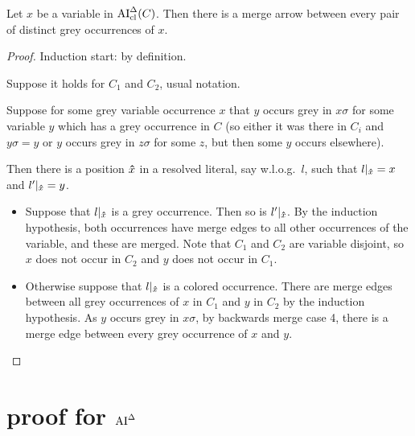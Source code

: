 \documentclass[,%
	paper=a4,%
	DIV10, %
	twoside=false,%
	liststotoc,
	bibtotoc,
	draft=false,%
	numbers=noendperiod
]{scrartcl}
\begin{document}
\begin{lemma}
	\label{lemma:arrow_from_grey_to_grey}
	Let $x$ be a variable in $\operatorname{AI}_\mathrm{cl}^\Delta(C)$.
	Then there is a merge arrow between every pair of distinct grey occurrences of $x$. 
\end{lemma}
\begin{proof}
	Induction start: by definition.

	Suppose it holds for $C_1$ and $C_2$, usual notation.

	Suppose for some grey variable occurrence $x$ that $y$ occurs grey in $x\sigma$ for some variable $y$ which has a grey occurrence in $C$ (so either it was there in $C_i$ and $y\sigma = y$ or $y$ occurs grey in $z\sigma$ for some $z$, but then some $y$ occurs elsewhere). 

	Then there is a position $\bm\hat x$ in a resolved literal, say w.l.o.g.\ $l$, such that $l|_{\bm\hat x} = x$ and $l'|_{\bm\hat x} = y$.

	\begin{itemize}
		\item
			Suppose that $l|_{\bm\hat x}$ is a grey occurrence.
			Then so is $l'|_{\bm\hat x}$.
			By the induction hypothesis, both occurrences have merge edges to all other occurrences of the variable, and these are merged.
			Note that $C_1$ and $C_2$ are variable disjoint, so $x$ does not occur in $C_2$ and $y$ does not occur in $C_1$.

		\item
			Otherwise suppose that $l|_{\bm\hat x}$ is a colored occurrence.
			There are merge edges between all grey occurrences of $x$ in $C_1$ and $y$ in $C_2$ by the induction hypothesis.
			As $y$ occurs grey in $x\sigma$, by backwards merge case 4, there is a merge edge between every grey occurrence of $x$ and $y$.
			\qedhere
	\end{itemize}

\end{proof}

\section{proof for $\operatorname{AI}^\Delta$}
\end{document}
